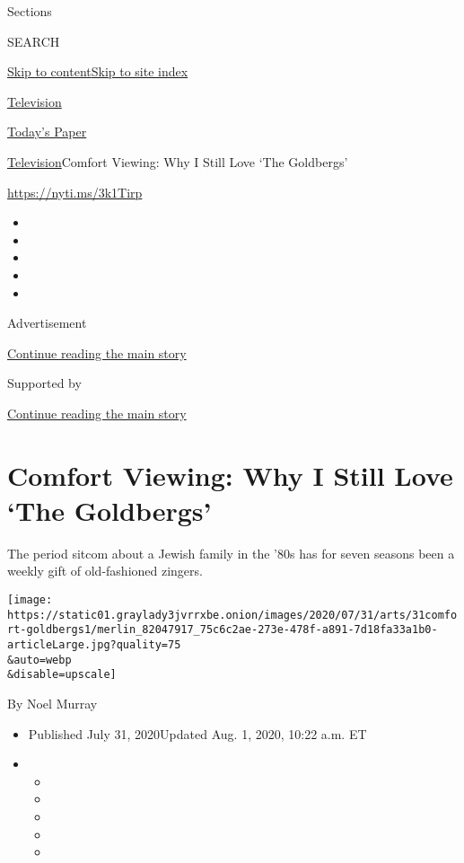 Sections

SEARCH

\protect\hyperlink{site-content}{Skip to
content}\protect\hyperlink{site-index}{Skip to site index}

\href{https://www.nytimes3xbfgragh.onion/section/arts/television}{Television}

\href{https://myaccount.nytimes3xbfgragh.onion/auth/login?response_type=cookie\&client_id=vi}{}

\href{https://www.nytimes3xbfgragh.onion/section/todayspaper}{Today's
Paper}

\href{/section/arts/television}{Television}\textbar{}Comfort Viewing:
Why I Still Love `The Goldbergs'

\url{https://nyti.ms/3k1Tirp}

\begin{itemize}
\item
\item
\item
\item
\item
\end{itemize}

Advertisement

\protect\hyperlink{after-top}{Continue reading the main story}

Supported by

\protect\hyperlink{after-sponsor}{Continue reading the main story}

\hypertarget{comfort-viewing-why-i-still-love-the-goldbergs}{%
\section{Comfort Viewing: Why I Still Love `The
Goldbergs'}\label{comfort-viewing-why-i-still-love-the-goldbergs}}

The period sitcom about a Jewish family in the '80s has for seven
seasons been a weekly gift of old-fashioned zingers.

\texttt{[image: https://static01.graylady3jvrrxbe.onion/images/2020/07/31/arts/31comfort-goldbergs1/merlin\_82047917\_75c6c2ae-273e-478f-a891-7d18fa33a1b0-articleLarge.jpg?quality=75\\\&auto=webp\\\&disable=upscale]}

By Noel Murray

\begin{itemize}
\item
  Published July 31, 2020Updated Aug. 1, 2020, 10:22 a.m. ET
\item
  \begin{itemize}
  \item
  \item
  \item
  \item
  \item
  \end{itemize}
\end{itemize}

